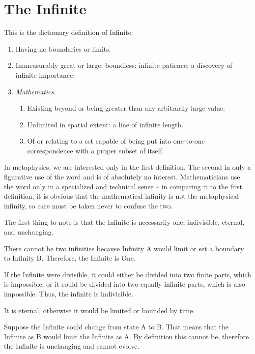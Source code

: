 \section{The Infinite}

This is the dictionary definition of Infinite:

\begin{enumerate}

\def\labelenumi{\arabic{enumi}.}


\item Having no boundaries or limits.

\item Immeasurably great or large; boundless: infinite patience; a discovery of infinite importance.

\item \emph{Mathematics.}


  \begin{enumerate}

  \def\labelenumii{\alph{enumii}.}

  
\item Existing beyond or being greater than any arbitrarily large value.
  
\item Unlimited in spatial extent: a line of infinite length.
  
\item Of or relating to a set capable of being put into one-to-one correspondence with a proper subset of itself.
  \end{enumerate}

\end{enumerate}


In metaphysics, we are interested only in the first definition. The second in only a figurative use of the word and is of absolutely no interest. Mathematicians use the word only in a specialized and technical sense -- in comparing it to the first definition, it is obvious that the mathematical infinity is not the metaphysical infinity, so care must be taken never to confuse the two.

The first thing to note is that the Infinite is necessarily one, indivisible, eternal, and unchanging.

There cannot be two infinities because Infinity A would limit or set a boundary to Infinity B. Therefore, the Infinite is One.

If the Infinite were divisible, it could either be divided into two finite parts, which is impossible, or it could be divided into two equally infinite parts, which is also impossible. Thus, the infinite is indivisible.

It is eternal, otherwise it would be limited or bounded by time.

Suppose the Infinite could change from state A to B. That means that the Infinite as B would limit the Infinite as A. By definition this cannot be, therefore the Infinite is unchanging and cannot evolve.



